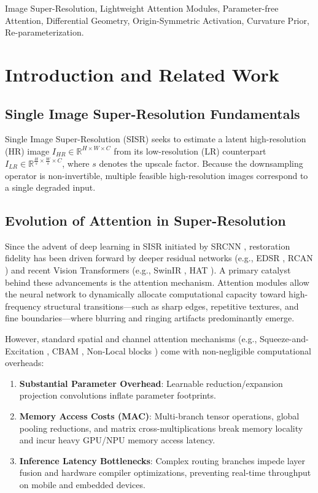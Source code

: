 \documentclass[conference]{IEEEtran}
\begin{document}
\begin{IEEEkeywords}
Image Super-Resolution, Lightweight Attention Modules, Parameter-free Attention, Differential Geometry, Origin-Symmetric Activation, Curvature Prior, Re-parameterization.
\end{IEEEkeywords}

\section{Introduction and Related Work}

\subsection{Single Image Super-Resolution Fundamentals}
Single Image Super-Resolution (SISR) seeks to estimate a latent high-resolution (HR) image $I_{HR} \in \mathbb{R}^{H \times W \times C}$ from its low-resolution (LR) counterpart $I_{LR} \in \mathbb{R}^{\frac{H}{s} \times \frac{W}{s} \times C}$, where $s$ denotes the upscale factor. Because the downsampling operator is non-invertible, multiple feasible high-resolution images correspond to a single degraded input.

\subsection{Evolution of Attention in Super-Resolution}
Since the advent of deep learning in SISR initiated by SRCNN \cite{dong2015image}, restoration fidelity has been driven forward by deeper residual networks (e.g., EDSR \cite{lim2017enhanced}, RCAN \cite{zhang2018image}) and recent Vision Transformers (e.g., SwinIR \cite{liang2021swinir}, HAT \cite{chen2023activating}). A primary catalyst behind these advancements is the attention mechanism. Attention modules allow the neural network to dynamically allocate computational capacity toward high-frequency structural transitions—such as sharp edges, repetitive textures, and fine boundaries—where blurring and ringing artifacts predominantly emerge.

However, standard spatial and channel attention mechanisms (e.g., Squeeze-and-Excitation \cite{hu2018squeeze}, CBAM \cite{woo2018cbam}, Non-Local blocks \cite{wang2018non}) come with non-negligible computational overheads:
\begin{enumerate}
    \item \textbf{Substantial Parameter Overhead}: Learnable reduction/expansion projection convolutions inflate parameter footprints.
    \item \textbf{Memory Access Costs (MAC)}: Multi-branch tensor operations, global pooling reductions, and matrix cross-multiplications break memory locality and incur heavy GPU/NPU memory access latency.
    \item \textbf{Inference Latency Bottlenecks}: Complex routing branches impede layer fusion and hardware compiler optimizations, preventing real-time throughput on mobile and embedded devices.
\end{enumerate}
\end{document}

